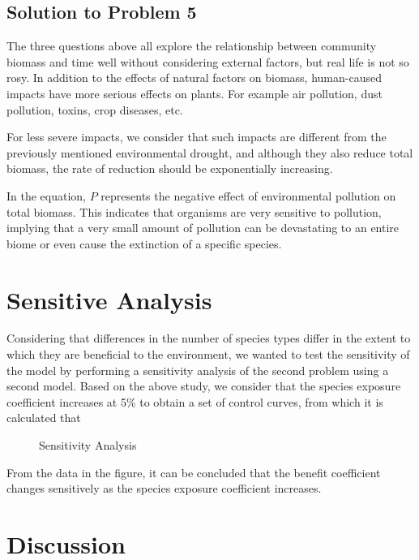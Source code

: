 \documentclass[12pt]{article}
\begin{document}
\subsection{Solution to Problem 5}

The three questions above all explore the relationship between community biomass and time well without considering external factors, but real life is not so rosy. In addition to the effects of natural factors on biomass, human-caused impacts have more serious effects on plants. For example air pollution, dust pollution, toxins, crop diseases, etc.

For less severe impacts, we consider that such impacts are different from the previously mentioned environmental drought, and although they also reduce total biomass, the rate of reduction should be exponentially increasing.

In the equation, $P$ represents the negative effect of environmental pollution on total biomass. This indicates that organisms are very sensitive to pollution, implying that a very small amount of pollution can be devastating to an entire biome or even cause the extinction of a specific species.

\section{Sensitive Analysis}

Considering that differences in the number of species types differ in the extent to which they are beneficial to the environment, we wanted to test the sensitivity of the model by performing a sensitivity analysis of the second problem using a second model. Based on the above study, we consider that the species exposure coefficient increases at 5\% to obtain a set of control curves, from which it is calculated that

\begin{figure}
	\centering
	\subfigure{}
	\subfigure{}
	\caption{Sensitivity Analysis}
\end{figure}

From the data in the figure, it can be concluded that the benefit coefficient changes sensitively as the species exposure coefficient increases.

\section{Discussion}
\end{document}
